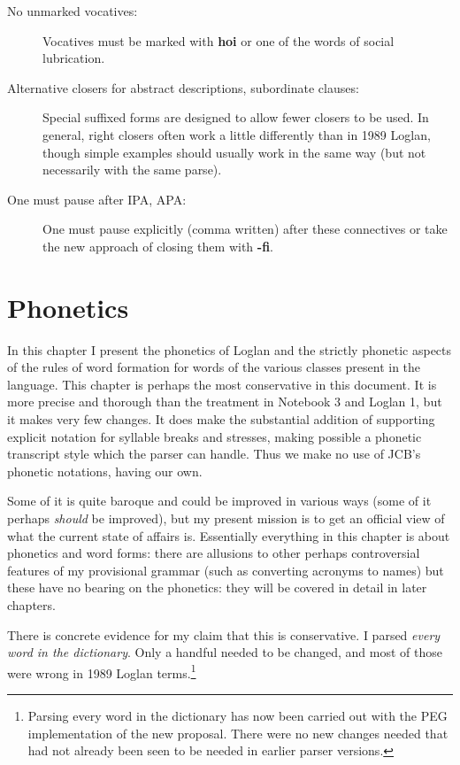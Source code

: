 \documentclass[12pt]{book}
\begin{document}
\begin{description}
\item[No unmarked vocatives:]  Vocatives must be marked with {\bf hoi} or one of the words of social lubrication.

\item[Alternative closers for abstract descriptions, subordinate clauses:]  Special suffixed forms are designed to allow fewer closers to be used.  In general, right closers often work a little differently than in 1989 Loglan, though simple examples should usually work in the same way (but not necessarily with the same parse).

\item[One must pause after IPA, APA:]  One must pause explicitly (comma written) after these connectives or take the new approach of closing them with {\bf -fi}.

\end{description}

\chapter{Phonetics}

In this chapter I present the phonetics of Loglan and the strictly phonetic aspects of the rules of word formation for words of the various classes present in the language.  This chapter is perhaps the  most conservative in this document.  It is more precise and thorough than the treatment in Notebook 3 and Loglan 1, but it makes very few changes.  It does make the substantial addition of supporting explicit notation for syllable breaks and stresses, making possible a phonetic transcript style which the parser can handle.  Thus we make no use of JCB's phonetic notations, having our own.

 Some of it is quite baroque and could be improved in various ways (some of it perhaps {\em should\/} be improved), but my present mission is to get an official view of what the current state of affairs is.   Essentially everything in this chapter  is about phonetics and word forms:  there are allusions to other perhaps controversial features of my provisional grammar (such as converting acronyms to names) but these have no bearing on the phonetics:  they will be covered in detail in later chapters.

There is concrete evidence for my claim that this is conservative.  I parsed {\em every word in the dictionary\/}.  Only a handful needed to be changed,
and most of those were wrong in 1989 Loglan terms.\footnote{Parsing every word in the dictionary has now been carried out with the PEG implementation of the new proposal.  There were no new changes needed that had not already been seen to be needed in earlier parser versions.}
\end{document}
